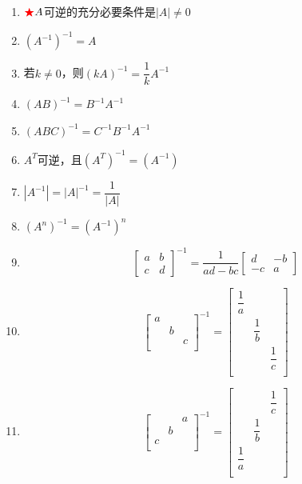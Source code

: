 \documentclass[./linear_algebra.tex]{subfiles}
\begin{document}
    \begin{enumerate}
        \item ${\color{red}{\bigstar}}A$可逆的充分必要条件是$|A| \neq 0$
        \item $(A^{-1})^{-1} = A$
        \item 若$k \neq 0$，则$(kA)^{-1} = \dfrac{1}{k}A^{-1}$
        \item $(AB)^{-1} = B^{-1}A^{-1}$
        \item $(ABC)^{-1} = C^{-1}B^{-1}A^{-1}$
        \item $A^T$可逆，且$(A^T)^{-1} = (A^{-1})$
        \item $|A^{-1}| = |A|^{-1} = \dfrac{1}{|A|}$
        \item $(A^n)^{-1} = (A^{-1})^n$
        \item
        \[
            \begin{bmatrix}
                a & b \\
                c & d
            \end{bmatrix}^{-1}
            = \frac{1}{ad - bc}\begin{bmatrix}
                                   d  & -b \\
                                   -c & a
            \end{bmatrix}
        \]
        \item
        \[
            \begin{bmatrix}
                a&   &  \\
                & b &   \\
                &   &c   \\
            \end{bmatrix}^{-1}
            = \begin{bmatrix}
                  \dfrac{1}{a}&             &  \\
                  & \dfrac{1}{b} &             \\
                  &             &  \dfrac{1}{c}           \\
            \end{bmatrix}
        \]
        \item
        \[
            \begin{bmatrix}
                &   & a \\
                & b &   \\
                c &   &   \\
            \end{bmatrix}^{-1}
            = \begin{bmatrix}
                  &             & \dfrac{1}{c} \\
                  & \dfrac{1}{b} &             \\
                  \dfrac{1}{a} &             &             \\
            \end{bmatrix}
        \]
    \end{enumerate}
\end{document}
